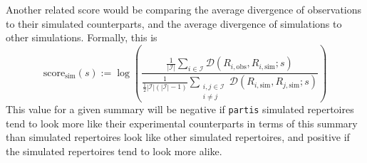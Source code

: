\documentclass{article}
\begin{document}
Another related score would be comparing the average divergence of observations to their simulated counterparts, and the average divergence of simulations to other simulations.
Formally, this is
\begin{equation}
    \text{score}_\text{sim}(s) := \log \left( \frac{ \frac{1}{|\mathcal I|} \sum_{i \in \mathcal I} \mathcal D \left( R_{i, \text{obs}}, R_{i, \text{sim}} ; s\right) }
    { \frac{1}{\frac{1}{2} |\mathcal I|\left(|\mathcal I| - 1\right)}
        \sum_{\substack{i, j \in \mathcal I \\ i \ne j}} \mathcal D\left(R_{i, \text{sim}}, R_{j, \text{sim}}; s\right) } \right)
\end{equation}
This value for a given summary will be negative if \texttt{partis} simulated repertoires tend to look more like their experimental counterparts in terms of this summary than simulated repertoires look like other simulated repertoires, and positive if the simulated repertoires tend to look more alike.
\end{document}
